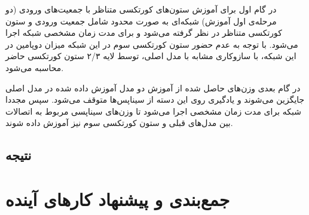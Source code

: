 \documentclass[12pt]{report}
\begin{document}
	در گام اول برای آموزش ستون‌های کورتکسی متناظر با جمعیت‌های ورودی (دو مرحله‌ی اول آموزش) شبکه‌ای به صورت محدود شامل جمعیت ورودی و ستون کورتکسی متناظر در نظر گرفته می‌شود و برای مدت زمان مشخصی شبکه اجرا می‌شود. با توجه به عدم حضور ستون کورتکسی سوم در این شبکه میزان دوپامین در این شبکه، با سازوکاری مشابه با مدل اصلی، توسط لایه ۲/۳ ستون کورتکسی حاضر محاسبه می‌شود.
	
	در گام بعدی وزن‌های حاصل شده از آموزش دو مدل آموزش داده شده در مدل اصلی جایگزین می‌شوند و یادگیری روی این دسته از سیناپس‌ها متوقف می‌شود. سپس مجددا شبکه برای مدت زمان مشخصی اجرا می‌شود تا وزن‌های سیناپسی مربوط به اتصالات بین مدل‌های قبلی و ستون کورتکسی سوم نیز آموزش داده شوند.
	

	\section{نتیجه}
	
	
	
	\chapter{جمع‌بندی و پیشنهاد کار‌های آینده}
	
	
	
	
	
	
	\printglossary[title=واژه‌نامه فارسی به انگلیسی, toctitle=واژه‌نامه فارسی به انگلیسی]
	
	
	\begin{latin}
		
		\renewcommand{\bibname}{\rl{{مراجع}\hfill}}
		
	\end{latin}
	
\end{document}
